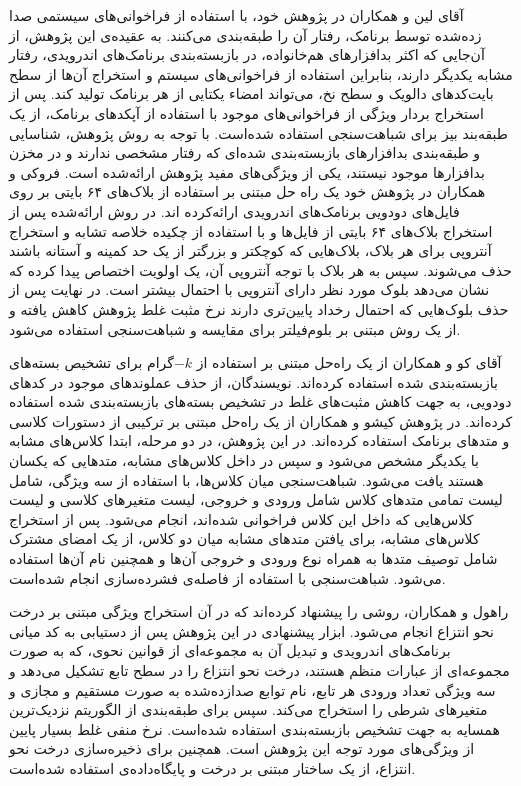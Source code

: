 آقای لین و همکاران در پژوهش خود، با استفاده از فراخوانی‌های سیستمی‌ صدا زده‌شده توسط برنامک، رفتار آن را طبقه‌بندی می‌کنند. به عقیده‌ی این پژوهش، از آن‌جایی که اکثر بدافزار‌های هم‌خانواده، در بازبسته‌بندی برنامک‌های اندرویدی، رفتار مشابه یکدیگر دارند، بنابراین استفاده از فراخوانی‌های سیستم و استخراج آن‌ها از سطح بایت‌کد‌های دالویک و سطح نخ‌، می‌تواند امضاء یکتایی از هر برنامک تولید کند. پس از استخراج بردار ویژگی‌ از فراخوانی‌های موجود با استفاده از آپکد‌های برنامک، از یک طبقه‌بند بیز برای شباهت‌سنجی استفاده شده‌است. با توجه به روش پژوهش، شناسایی و طبقه‌بندی بدافزار‌های بازبسته‌بندی شده‌ای که رفتار مشخصی ندارند و در مخزن بدافزار‌ها موجود نیستند، یکی از ویژگی‌های مفید پژوهش ارائه‌شده است. فروکی و همکاران   در پژوهش خود یک راه حل مبتنی بر استفاده از بلاک‌های ۶۴ بایتی بر روی فایل‌های دودویی برنامک‌های اندرویدی ارائه‌کرده ‌اند. در روش ارائه‌شده پس از استخراج بلاک‌های ۶۴ بایتی از فایل‌ها و با استفاده از چکیده‌ خلاصه تشابه و استخراج آنتروپی‌ برای هر بلاک، بلاک‌هایی که کوچکتر و بزرگتر از یک حد کمینه و آستانه باشند حذف می‌شوند. سپس به هر بلاک با توجه آنتروپی آن، یک اولویت اختصاص پیدا کرده که نشان می‌دهد بلوک مورد نظر دارای آنتروپی با احتمال بیشتر است. در نهایت پس از حذف بلوک‌هایی که احتمال رخداد پایین‌تری دارند نرخ مثبت غلط پژوهش کاهش یافته و از یک روش مبتنی بر بلوم‌فیلتر‌ برای مقایسه‌ و شباهت‌سنجی استفاده می‌شود.

آقای کو و همکاران از یک راه‌حل مبتنی بر استفاده از $-k$گرام برای تشخیص بسته‌های بازبسته‌بندی شده استفاده کرده‌اند. نویسندگان، از  حذف عملوند‌های‌ موجود در کد‌های دودویی، به‌ جهت کاهش مثبت‌های غلط در تشخیص بسته‌های بازبسته‌بندی شده استفاده کرده‌اند.
در پژوهش کیشو و همکاران  از یک راه‌حل مبتنی بر ترکیبی از دستورات کلاسی و متد‌های برنامک استفاده ‌کرده‌اند‌. در این پژوهش، در دو مرحله، ابتدا کلاس‌های مشابه‌ با یکدیگر مشخص می‌شود و سپس در داخل کلاس‌های مشابه، متد‌هایی که یکسان هستند یافت می‌شود. شباهت‌سنجی میان کلاس‌ها، با استفاده از سه ویژگی، شامل لیست تمامی‌ متد‌های کلاس شامل ورودی و خروجی، لیست متغیر‌های کلاسی و لیست کلاس‌هایی که داخل این کلاس فراخوانی ‌شده‌اند، انجام می‌شود. پس از استخراج کلاس‌های مشابه، برای یافتن متد‌های مشابه میان دو کلاس، از یک امضای مشترک شامل توصیف متد‌ها به همراه نوع ورودی و خروجی آن‌ها و همچنین نام آن‌ها استفاده می‌شود. شباهت‌سنجی با استفاده از فاصله‌ی فشرده‌سازی انجام شده‌است.

راهول و همکاران، روشی را پیشنهاد کرده‌اند که در آن استخراج ویژگی مبتنی بر درخت نحو انتزاع انجام می‌شود. ابزار پیشنهادی در این پژوهش پس از دستیابی به کد میانی برنامک‌های اندرویدی و تبدیل آن به مجموعه‌ای از قوانین نحوی، که به صورت مجموعه‌ای از عبارات منظم‌ هستند، درخت نحو انتزاع را در سطح تابع تشکیل می‌دهد و سه ویژگی تعداد ورودی هر تابع، نام توابع صدازده‌شده به صورت مستقیم و مجازی‌ و متغیر‌های شرطی را استخراج می‌کند. سپس برای طبقه‌بندی از الگوریتم نزدیک‌ترین همسایه‌ به جهت تشخیص بازبسته‌بندی استفاده شده‌است. نرخ منفی غلط بسیار پایین از ویژگی‌های مورد توجه این پژوهش است. همچنین برای ذخیره‌سازی درخت نحو انتزاع، از یک ساختار مبتنی بر درخت  و پایگاه‌داده‌ی  استفاده شده‌است.

